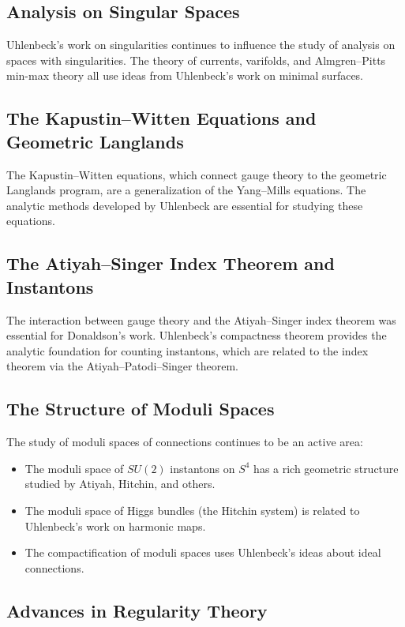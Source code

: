 \subsection{Analysis on Singular Spaces}

Uhlenbeck's work on singularities continues to influence the study of analysis on spaces with singularities. The theory of currents, varifolds, and Almgren--Pitts min-max theory all use ideas from Uhlenbeck's work on minimal surfaces.

\subsection{The Kapustin--Witten Equations and Geometric Langlands}

The Kapustin--Witten equations, which connect gauge theory to the geometric Langlands program, are a generalization of the Yang--Mills equations. The analytic methods developed by Uhlenbeck are essential for studying these equations.

\subsection{The Atiyah--Singer Index Theorem and Instantons}

The interaction between gauge theory and the Atiyah--Singer index theorem was essential for Donaldson's work. Uhlenbeck's compactness theorem provides the analytic foundation for counting instantons, which are related to the index theorem via the Atiyah--Patodi--Singer theorem.

\subsection{The Structure of Moduli Spaces}

The study of moduli spaces of connections continues to be an active area:
\begin{itemize}
\item The moduli space of $SU(2)$ instantons on $S^4$ has a rich geometric structure studied by Atiyah, Hitchin, and others.
\item The moduli space of Higgs bundles (the Hitchin system) is related to Uhlenbeck's work on harmonic maps.
\item The compactification of moduli spaces uses Uhlenbeck's ideas about ideal connections.
\end{itemize}

\subsection{Advances in Regularity Theory}

